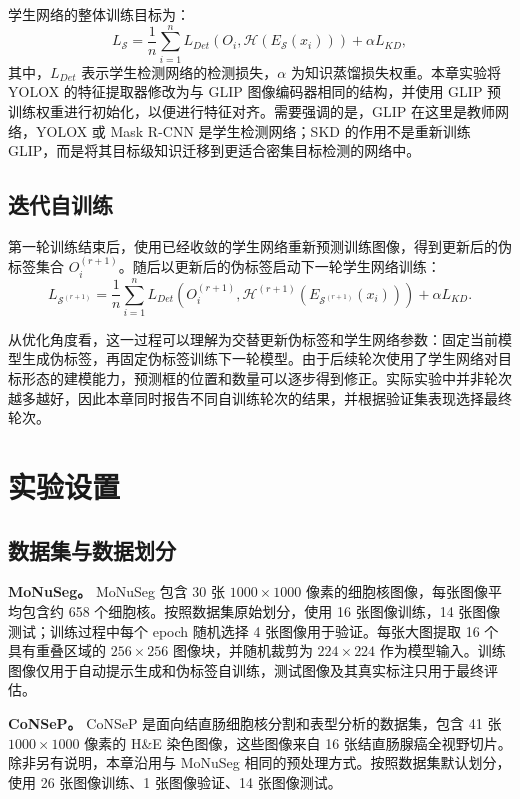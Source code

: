 学生网络的整体训练目标为：
\begin{equation}
\label{eq:attrip_student}
L_{\mathcal S}=\frac{1}{n}\sum_{i=1}^{n}
L_{Det}\left(O_i,\mathcal H(E_{\mathcal S}(x_i))\right)
+\alpha L_{KD},
\end{equation}
其中，$L_{Det}$ 表示学生检测网络的检测损失，$\alpha$ 为知识蒸馏损失权重。本章实验将 YOLOX 的特征提取器修改为与 GLIP 图像编码器相同的结构，并使用 GLIP 预训练权重进行初始化，以便进行特征对齐。需要强调的是，GLIP 在这里是教师网络，YOLOX 或 Mask R-CNN 是学生检测网络；SKD 的作用不是重新训练 GLIP，而是将其目标级知识迁移到更适合密集目标检测的网络中。

\subsection{迭代自训练}

第一轮训练结束后，使用已经收敛的学生网络重新预测训练图像，得到更新后的伪标签集合 $O_i^{(r+1)}$。随后以更新后的伪标签启动下一轮学生网络训练：
\begin{equation}
\label{eq:attrip_iterative}
L_{\mathcal S^{(r+1)}}=\frac{1}{n}\sum_{i=1}^{n}
L_{Det}\left(O_i^{(r+1)},
\mathcal H^{(r+1)}(E_{\mathcal S^{(r+1)}}(x_i))\right)
+\alpha L_{KD}.
\end{equation}

从优化角度看，这一过程可以理解为交替更新伪标签和学生网络参数：固定当前模型生成伪标签，再固定伪标签训练下一轮模型。由于后续轮次使用了学生网络对目标形态的建模能力，预测框的位置和数量可以逐步得到修正。实际实验中并非轮次越多越好，因此本章同时报告不同自训练轮次的结果，并根据验证集表现选择最终轮次。

\section{实验设置}

\subsection{数据集与数据划分}

\textbf{MoNuSeg。} MoNuSeg 包含 30 张 $1000\times1000$ 像素的细胞核图像，每张图像平均包含约 658 个细胞核。按照数据集原始划分，使用 16 张图像训练，14 张图像测试；训练过程中每个 epoch 随机选择 4 张图像用于验证。每张大图提取 16 个具有重叠区域的 $256\times256$ 图像块，并随机裁剪为 $224\times224$ 作为模型输入。训练图像仅用于自动提示生成和伪标签自训练，测试图像及其真实标注只用于最终评估。

\textbf{CoNSeP。} CoNSeP 是面向结直肠细胞核分割和表型分析的数据集，包含 41 张 $1000\times1000$ 像素的 H\&E 染色图像，这些图像来自 16 张结直肠腺癌全视野切片。除非另有说明，本章沿用与 MoNuSeg 相同的预处理方式。按照数据集默认划分，使用 26 张图像训练、1 张图像验证、14 张图像测试。

